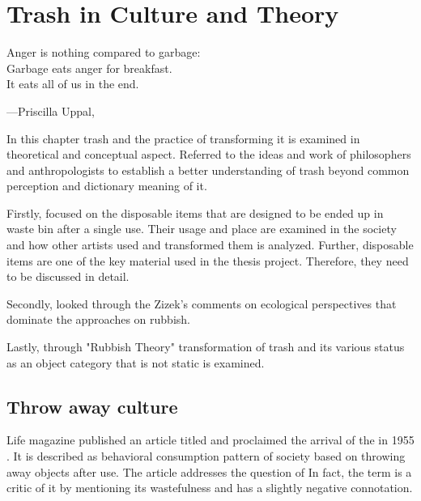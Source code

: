 \chapter{Trash in Culture and Theory}



\begin{singlespace}

\epigraph{Anger is nothing compared to garbage:\\ Garbage eats anger for breakfast.\\ It eats all of us in the end.}{\hfill---Priscilla Uppal, }

\end{singlespace}




%
%
In this chapter trash and the practice of transforming it is examined in theoretical and conceptual aspect. Referred to the ideas and work of philosophers and anthropologists to establish a better understanding of trash beyond common perception and dictionary meaning of it. 

Firstly, focused on the disposable items that are designed to be ended up in waste bin after a single use. Their usage and place are examined in the society and how other artists used and transformed them is analyzed. Further, disposable items are one of the key material used in the thesis project. Therefore, they need to be discussed in detail.

Secondly, looked through the Zizek's comments on ecological perspectives that dominate the approaches on rubbish.

Lastly, through "Rubbish Theory" transformation of trash and its various status as an object category that is not static is examined.  





%
%
\section{Throw away culture}





Life magazine published an article titled  and proclaimed the arrival of the  in 1955 . It is described as behavioral consumption pattern of society based on throwing away objects after use. The article addresses the question of 
 In fact, the term   is a critic of it by mentioning its wastefulness and has a slightly negative connotation. 

